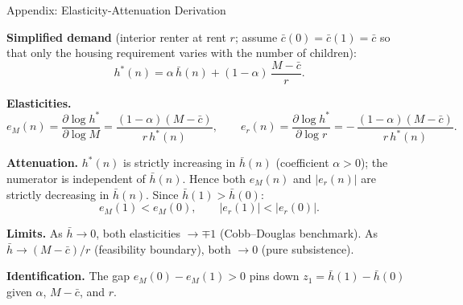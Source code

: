 \documentclass[11pt,aspectratio=169]{beamer}
\begin{document}
\begin{frame}{Appendix: Elasticity-Attenuation Derivation \; \hyperlink{slide1-main}{}}
\label{app:elasticity}
\small

\textbf{Simplified demand} (interior renter at rent $r$; assume $\bar c(0)=\bar c(1)=\bar c$ so that only the housing requirement varies with the number of children):
\[
h^\ast(n) = \alpha\,\bar h(n) + (1-\alpha)\,\frac{M-\bar c}{r}.
\]

\vspace{0.4em}
\textbf{Elasticities.}
\[
e_M(n) = \frac{\partial \log h^\ast}{\partial \log M}
= \frac{(1-\alpha)(M-\bar c)}{r\,h^\ast(n)},
\qquad
e_r(n) = \frac{\partial \log h^\ast}{\partial \log r}
= -\,\frac{(1-\alpha)(M-\bar c)}{r\,h^\ast(n)}.
\]

\vspace{0.4em}
\textbf{Attenuation.} $h^\ast(n)$ is strictly increasing in $\bar h(n)$
(coefficient $\alpha > 0$); the numerator is independent of $\bar h(n)$.
Hence both $e_M(n)$ and $|e_r(n)|$ are strictly decreasing in
$\bar h(n)$. Since $\bar h(1) > \bar h(0)$:
\[
e_M(1) < e_M(0),
\qquad
|e_r(1)| < |e_r(0)|.
\]

\vspace{0.4em}
\textbf{Limits.} As $\bar h \to 0$, both elasticities $\to \mp 1$
(Cobb--Douglas benchmark). As $\bar h \to (M-\bar c)/r$ (feasibility
boundary), both $\to 0$ (pure subsistence).

\vspace{0.4em}
\textbf{Identification.} The gap $e_M(0) - e_M(1) > 0$ pins down
$z_1 = \bar h(1) - \bar h(0)$ given $\alpha$, $M-\bar c$, and $r$.
\end{frame}
\end{document}
